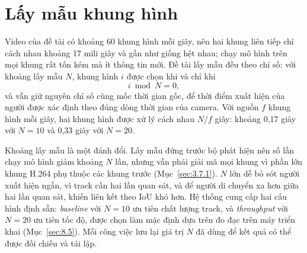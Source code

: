 \section{Lấy mẫu khung hình}
\label{sec:3.4}
\label{sec:3.4.3}

Video của đề tài có khoảng 60 khung hình mỗi giây, nên hai khung liên tiếp chỉ cách nhau khoảng 17 mili giây và gần như giống hệt nhau; chạy mô hình trên mọi khung rất tốn kém mà ít thông tin mới. Đề tài lấy mẫu đều theo chỉ số: với khoảng lấy mẫu $N$, khung hình $i$ được chọn khi và chỉ khi
\begin{equation}
    i \bmod N = 0,
    \label{eq:sampling}
\end{equation}
và vẫn giữ nguyên chỉ số cùng mốc thời gian gốc, để thời điểm xuất hiện của người được xác định theo đúng dòng thời gian của camera. Với nguồn $f$ khung hình mỗi giây, hai khung hình được xử lý cách nhau $N/f$ giây: khoảng 0,17 giây với $N = 10$ và 0,33 giây với $N = 20$.

Khoảng lấy mẫu là một đánh đổi. Lấy mẫu đứng trước bộ phát hiện nên số lần chạy mô hình giảm khoảng $N$ lần, nhưng vẫn phải giải mã mọi khung vì phần lớn khung H.264 phụ thuộc các khung trước (Mục~\ref{sec:3.7.1}). $N$ lớn dễ bỏ sót người xuất hiện ngắn, vì track cần hai lần quan sát, và để người di chuyển xa hơn giữa hai lần quan sát, khiến liên kết theo IoU khó hơn. Hệ thống cung cấp hai cấu hình định sẵn: \emph{baseline} với $N = 10$ ưu tiên chất lượng track, và \emph{throughput} với $N = 20$ ưu tiên tốc độ, được chọn làm mặc định dựa trên đo đạc trên máy triển khai (Mục~\ref{sec:8.5}). Mỗi công việc lưu lại giá trị $N$ đã dùng để kết quả có thể được đối chiếu và tái lập.
